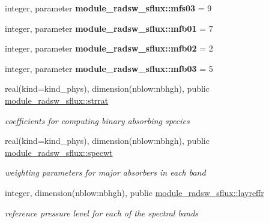 \begin{Indent}
\begin{DoxyCompactItemize}
integer, parameter {\bfseries module\+\_\+radsw\+\_\+sflux\+::mfs03} = 9
\item 
\mbox{\label{namespacemodule__radsw__sflux_a08a0f1278962ac27634169ea7632bc70}} 
integer, parameter {\bfseries module\+\_\+radsw\+\_\+sflux\+::mfb01} = 7
\item 
\mbox{\label{namespacemodule__radsw__sflux_afdf71cabed6ae0076d98ff0e563dbc61}} 
integer, parameter {\bfseries module\+\_\+radsw\+\_\+sflux\+::mfb02} = 2
\item 
\mbox{\label{namespacemodule__radsw__sflux_a2e3b510d781c596fa0bb9b1359a988dd}} 
integer, parameter {\bfseries module\+\_\+radsw\+\_\+sflux\+::mfb03} = 5
\item 
\mbox{\label{namespacemodule__radsw__sflux_aee2a2275da028b0960c5c1c8a34f46cf}} 
real(kind=kind\+\_\+phys), dimension(nblow\+:nbhgh), public \hyperlink{namespacemodule__radsw__sflux_aee2a2275da028b0960c5c1c8a34f46cf}{module\+\_\+radsw\+\_\+sflux\+::strrat}
\begin{DoxyCompactList}\small\item\em coefficients for computing binary absorbing species \end{DoxyCompactList}\item 
\mbox{\label{namespacemodule__radsw__sflux_a7d1a386e92555bcb09239ab098d8b398}} 
real(kind=kind\+\_\+phys), dimension(nblow\+:nbhgh), public \hyperlink{namespacemodule__radsw__sflux_a7d1a386e92555bcb09239ab098d8b398}{module\+\_\+radsw\+\_\+sflux\+::specwt}
\begin{DoxyCompactList}\small\item\em weighting parameters for major absorbers in each band \end{DoxyCompactList}\item 
\mbox{\label{namespacemodule__radsw__sflux_a90c56da1bcadbea0b42e12487c1c1eec}} 
integer, dimension(nblow\+:nbhgh), public \hyperlink{namespacemodule__radsw__sflux_a90c56da1bcadbea0b42e12487c1c1eec}{module\+\_\+radsw\+\_\+sflux\+::layreffr}
\begin{DoxyCompactList}\small\item\em reference pressure level for each of the spectral bands \end{DoxyCompactList}\item 

\end{DoxyCompactItemize}
\end{Indent}
